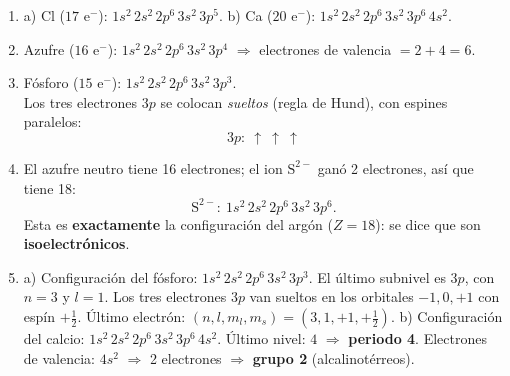 \documentclass[12pt, letterpaper]{article}
\begin{document}
  \begin{enumerate}[leftmargin=*, label=\textbf{\arabic*.}]
    \item a) Cl ($17$ e$^-$): $1s^{2}\,2s^{2}\,2p^{6}\,3s^{2}\,3p^{5}$.
          \quad b) Ca ($20$ e$^-$): $1s^{2}\,2s^{2}\,2p^{6}\,3s^{2}\,3p^{6}\,4s^{2}$.

    \item Azufre ($16$ e$^-$): $1s^{2}\,2s^{2}\,2p^{6}\,3s^{2}\,3p^{4}$ $\Rightarrow$ electrones de valencia $= 2 + 4 = 6$.

    \item Fósforo ($15$ e$^-$): $1s^{2}\,2s^{2}\,2p^{6}\,3s^{2}\,3p^{3}$.
          \\[2pt]
          Los tres electrones $3p$ se colocan \emph{sueltos} (regla de Hund), con espines paralelos:
          \[
            3p:\ \boxed{\uparrow}\ \boxed{\uparrow}\ \boxed{\uparrow}
          \]

    \item El azufre neutro tiene 16 electrones; el ion $\text{S}^{2-}$ ganó 2 electrones, así que tiene 18:
          \[
            \text{S}^{2-}:\ 1s^{2}\,2s^{2}\,2p^{6}\,3s^{2}\,3p^{6}.
          \]
          Esta es \textbf{exactamente} la configuración del argón ($Z = 18$): se dice que son \textbf{isoelectrónicos}.

    \item a) Configuración del fósforo: $1s^{2}\,2s^{2}\,2p^{6}\,3s^{2}\,3p^{3}$. El último subnivel es $3p$, con $n = 3$ y $l = 1$.
          Los tres electrones $3p$ van sueltos en los orbitales $-1, 0, +1$ con espín $+\tfrac{1}{2}$.
          Último electrón: $(n, l, m_l, m_s) = (3, 1, +1, +\tfrac{1}{2})$.
          \quad b) Configuración del calcio: $1s^{2}\,2s^{2}\,2p^{6}\,3s^{2}\,3p^{6}\,4s^{2}$.
          Último nivel: $4$ $\Rightarrow$ \textbf{periodo 4}. Electrones de valencia: $4s^{2}$ $\Rightarrow$ 2 electrones $\Rightarrow$ \textbf{grupo 2} (alcalinotérreos).
  \end{enumerate}

\fi
\end{document}
